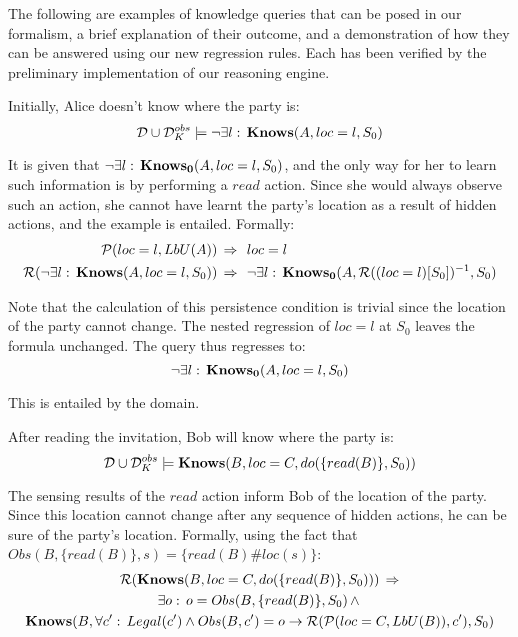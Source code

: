 The following are examples of knowledge queries that can be posed
in our formalism, a brief explanation of their outcome, and a demonstration
of how they can be answered using our new regression rules. Each has
been verified by the preliminary implementation of our reasoning engine.\\

\begin{example}
Initially, Alice doesn't know where the party is:\[
\mathcal{D}\cup\mathcal{D}_{K}^{obs}\models\neg\exists l:\,\mathbf{Knows}(A,loc=l,S_{0})\]

\end{example}
It is given that $\neg\exists l:\,\mathbf{Knows_{0}}(A,loc=l,S_{0})$, and the
only way for her to learn such information is by performing a $read$
action. Since she would always observe such an action, she cannot
have learnt the party's location as a result of hidden actions, and
the example is entailed. Formally:\begin{align*}
\mathcal{P}(loc=l,LbU(A))\,\Rightarrow\,\,\,\, & loc=l\\
\mathcal{R}(\neg\exists l:\,\mathbf{Knows}(A,loc=l,S_{0}))\,\Rightarrow\,\,\,\, & \neg\exists l:\,\mathbf{Knows_{0}}(A,\mathcal{R}((loc=l)[S_{0}])^{-1},S_{0})\end{align*}


Note that the calculation of this persistence condition is trivial
since the location of the party cannot change. The nested regression
of $loc=l$ at $S_{0}$ leaves the formula unchanged. The query thus
regresses to:\[
\neg\exists l:\,\mathbf{Knows_{0}}(A,loc=l,S_{0})\]


This is entailed by the domain. 
\begin{example}
After reading the invitation, Bob will know where the party is:\[
\mathcal{D}\cup\mathcal{D}_{K}^{obs}\models\mathbf{Knows}(B,loc=C,do(\{read(B)\},S_{0}))\]

\end{example}
The sensing results of the $read$ action inform Bob of the location
of the party. Since this location cannot change after any sequence
of hidden actions, he can be sure of the party's location. Formally,
using the fact that $Obs(B,\{read(B)\},s)=\{read(B)\#loc(s)\}$:\begin{multline*}
\mathcal{R}(\mathbf{Knows}(B,loc=C,do(\{read(B)\},S_{0})))\,\Rightarrow\\
\exists o:\, o=Obs(B,\{read(B)\},S_{0})\,\wedge\,\\
\mathbf{Knows}(B,\forall c':\, Legal(c')\wedge Obs(B,c')=o\rightarrow\mathcal{R}(\mathcal{P}(loc=C,LbU(B)),c'),S_{0})\end{multline*}


